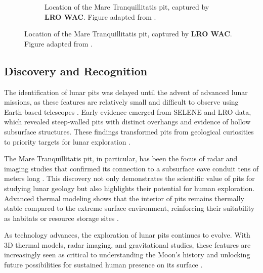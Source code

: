 \begin{figure}[h!]
\begin{subfigure}[c]{0.4\linewidth}
        \caption{Location of the Mare Tranquillitatis pit, captured by \textbf{LRO WAC}. Figure adapted from \cite{sublunear-lava}.}
        \label{fig:image2}
    \end{subfigure}
\end{figure}

\subsection{Discovery and Recognition}
The identification of lunar pits was delayed until the advent of advanced lunar missions, as these features are relatively small and difficult to observe using Earth-based telescopes \cite{lunar-pit-distribution}. Early evidence emerged from SELENE and LRO data, which revealed steep-walled pits with distinct overhangs and evidence of hollow subsurface structures. These findings transformed pits from geological curiosities to priority targets for lunar exploration \cite{lro, Carrer2024}.

The Mare Tranquillitatis pit, in particular, has been the focus of radar and imaging studies that confirmed its connection to a subsurface cave conduit tens of meters long \cite{Carrer2024}. This discovery not only demonstrates the scientific value of pits for studying lunar geology but also highlights their potential for human exploration. Advanced thermal modeling shows that the interior of pits remains thermally stable compared to the extreme surface environment, reinforcing their suitability as habitats or resource storage sites \cite{newer-thermal, lunar-pits-entrances-to-caves}.

As technology advances, the exploration of lunar pits continues to evolve. With 3D thermal models, radar imaging, and gravitational studies, these features are increasingly seen as critical to understanding the Moon’s history and unlocking future possibilities for sustained human presence on its surface \cite{newer-thermal, radar-observations-lava-tubes}.
